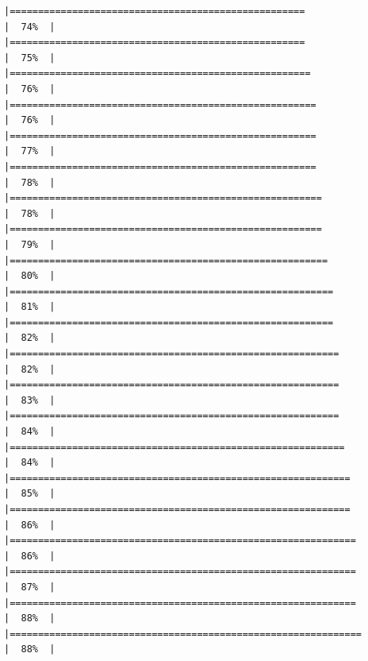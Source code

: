 \documentclass[
]{book}
\begin{document}
\begin{verbatim}
|====================================================                  |  74%  |                                                                              |====================================================                  |  75%  |                                                                              |=====================================================                 |  76%  |                                                                              |======================================================                |  76%  |                                                                              |======================================================                |  77%  |                                                                              |======================================================                |  78%  |                                                                              |=======================================================               |  78%  |                                                                              |=======================================================               |  79%  |                                                                              |========================================================              |  80%  |                                                                              |=========================================================             |  81%  |                                                                              |=========================================================             |  82%  |                                                                              |==========================================================            |  82%  |                                                                              |==========================================================            |  83%  |                                                                              |==========================================================            |  84%  |                                                                              |===========================================================           |  84%  |                                                                              |============================================================          |  85%  |                                                                              |============================================================          |  86%  |                                                                              |=============================================================         |  86%  |                                                                              |=============================================================         |  87%  |                                                                              |=============================================================         |  88%  |                                                                              |==============================================================        |  88%  |                                                                              
\end{verbatim}
\end{document}
